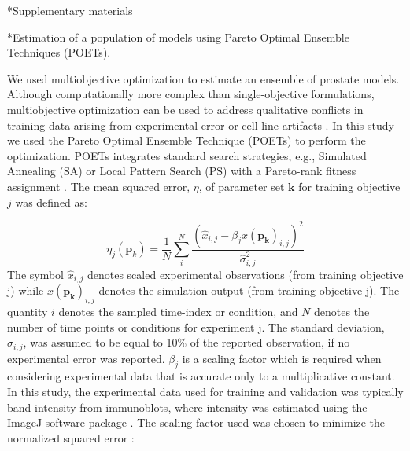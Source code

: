 \documentclass[12pt]{article}
\makeatletter
\renewcommand\subsection{\@startsection
	{subsection}{2}{0mm}
	{-0.05in}
	{-0.5\baselineskip}
	{\normalfont\normalsize\bfseries}}
\renewcommand\section{\@startsection
	{subsection}{2}{0mm}
	{-0.2in}
	{0.05\baselineskip}
	{\normalfont\large\bfseries}}
\makeatother
\begin{document}
\clearpage

\renewcommand\thefigure{S\arabic{figure}}
\renewcommand\thetable{T\arabic{table}}
\renewcommand\thepage{S-\arabic{page}}
\renewcommand\theequation{S\arabic{equation}}

\setcounter{equation}{0}
\setcounter{table}{0}
\setcounter{figure}{0}
\setcounter{page}{1}

\section*{Supplementary materials}

\subsection*{Estimation of a population of models using Pareto Optimal Ensemble Techniques (POETs).}

We used multiobjective optimization to estimate an ensemble of prostate models. Although computationally more complex than single-objective formulations, multiobjective optimization can be used to address qualitative conflicts in training data arising from experimental error or cell-line artifacts \cite{Handl2007}. In this study we used the Pareto Optimal Ensemble Technique (POETs) to perform the optimization. POETs integrates standard search strategies, e.g., Simulated Annealing (SA) or Local Pattern Search (PS) with a Pareto-rank fitness assignment \cite{Song2010}. The mean squared error, $\eta$, of parameter set $\mathbf{k}$ for training objective $j$ was defined as:    

\begin{equation}
\eta_j(\mathbf{p}_k) = \frac{1}{N}\sum_{i}^{N}\frac{(\hat{x}_{i,j} - \beta_j x(\mathbf{p_k})_{i,j})^2}{\hat{\sigma}^2_{i,j}}
\end{equation}
The symbol $\hat{x}_{i,j}$ denotes scaled experimental observations (from training objective j) while $x(\mathbf{p_k})_{i,j}$ denotes the simulation output (from training objective j). The quantity $i$ denotes the sampled time-index or condition, and $N$ denotes the number of time points or conditions for experiment j. The standard deviation, $\hat{\sigma}_{i,j}$, was assumed to be equal to 10\% of the reported observation, if no experimental error was reported. $\beta_j$ is a scaling factor which is required when considering experimental data that is accurate only to a multiplicative constant. In this study, the experimental data used for training and validation was typically band intensity from immunoblots, where intensity was estimated using the ImageJ software package \cite{Abramoff2004}. The scaling factor used was chosen to minimize the normalized squared error \cite{Brown2003}:
\end{document}
